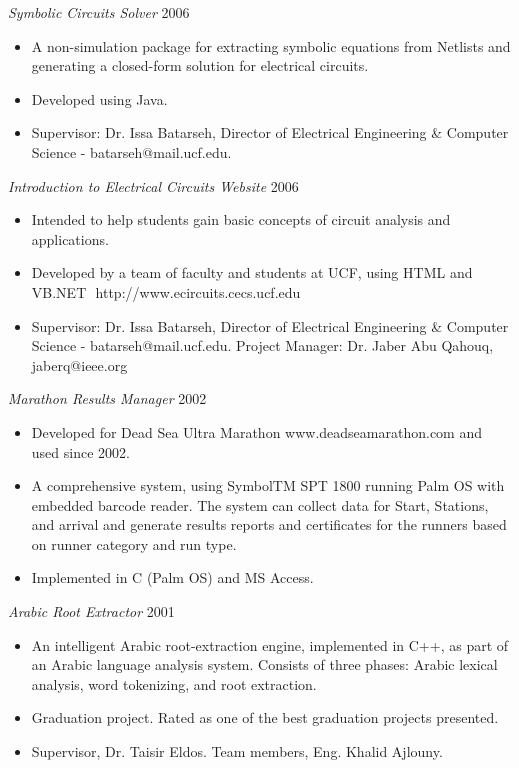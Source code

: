 \documentclass[line,margin]{res}
\begin{document}
\begin{resume}
{\sl Symbolic Circuits Solver } \hfill   2006 \\
\begin{itemize} \itemsep -2pt
     \item A non-simulation package for extracting symbolic equations from
      Netlists and generating a closed-form solution for electrical circuits.
     \item Developed using Java.
     \item Supervisor: Dr. Issa Batarseh, Director of Electrical Engineering \&
     Computer Science - batarseh@mail.ucf.edu.
\end{itemize} 

{\sl Introduction to Electrical Circuits Website} \hfill   2006 \\
\begin{itemize} \itemsep -2pt
     \item Intended to help students gain basic concepts of circuit analysis and
     applications.
     \item Developed by a team of faculty and students at UCF, using
     HTML and VB.NET  http://www.ecircuits.cecs.ucf.edu
     \item Supervisor: Dr. Issa Batarseh, Director of Electrical
     Engineering \& Computer Science - batarseh@mail.ucf.edu. Project Manager:
     Dr. Jaber Abu Qahouq, jaberq@ieee.org
\end{itemize} 

{\sl Marathon Results Manager} \hfill   2002 \\
\begin{itemize} \itemsep -2pt
     \item Developed for Dead Sea Ultra Marathon www.deadseamarathon.com and
     used since 2002.
     \item A comprehensive system, using SymbolTM SPT 1800 running Palm OS with
     embedded barcode reader. The system can collect data for Start, Stations,
     and arrival and generate results reports and certificates for the runners
     based on runner category and run type.
     \item Implemented in C (Palm OS) and MS Access.
\end{itemize} 

{\sl Arabic Root Extractor} \hfill   2001 \\
\begin{itemize} \itemsep -2pt
     \item An intelligent Arabic root-extraction engine, implemented in C++, as
     part of an Arabic language analysis system. Consists of three phases:
     Arabic lexical analysis, word tokenizing, and root extraction.
     \item Graduation project. Rated as one of the best graduation projects
     presented.
     \item Supervisor, Dr. Taisir Eldos. Team members, Eng. Khalid Ajlouny.
\end{itemize} 


\end{resume}
\end{document}
